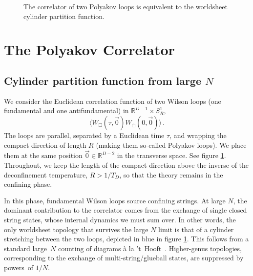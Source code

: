 \documentclass[
 reprint,
 amsmath,
 pre,
 amssymb,
 nofootinbib,
 aps,
 longbibliography,
]{revtex4-1}
\newcommand{\<}{{\langle}}
\renewcommand{\>}{{\rangle}}
\begin{document}
\begin{figure}[t]
\centering
{}
\caption{The correlator of two Polyakov loops is equivalent to the worldsheet cylinder partition function.}
\label{fig:Cylinder}
\end{figure}

\section{The Polyakov Correlator}\label{sec:secII}



\subsection{Cylinder partition function from large $N$}
\label{sec:IIA}

We consider the Euclidean correlation function of two Wilson loops (one fundamental and one antifundamental) in $\mathbb R^{D-1}\times S^1_R$,
\begin{equation}\label{eq:<WW>}
    \langle W_{\Box}(\tau,\vec 0) W_{\overline{\Box}}(0,\vec 0)\rangle\, \nonumber.
\end{equation}
The loops are parallel, separated by a Euclidean time $\tau$, and wrapping the compact direction of length $R$ (making them so-called Polyakov loops). We place them at the same position $\vec 0 \in \mathbb R^{D-2}$ in the transverse space. See figure \ref{fig:Cylinder}. Throughout, we keep the length of the compact direction above the inverse of the deconfinement temperature, $R>1/T_D$, so that the theory remains in the confining phase.

In this phase, fundamental Wilson loops source confining strings. At large $N$, the dominant contribution to the correlator comes from the exchange of single closed string states, whose internal dynamics we must sum over. In other words, the only worldsheet topology that survives the large $N$ limit is that of a cylinder stretching between the two loops, depicted in blue in figure \ref{fig:Cylinder}. This follows from a standard large~$N$ counting of diagrams \`a la 't~Hooft~\cite{tHooft:1973alw}. Higher-genus topologies, corresponding to the exchange of multi-string/glueball states, are suppressed by powers~of $1/N$.
\end{document}
